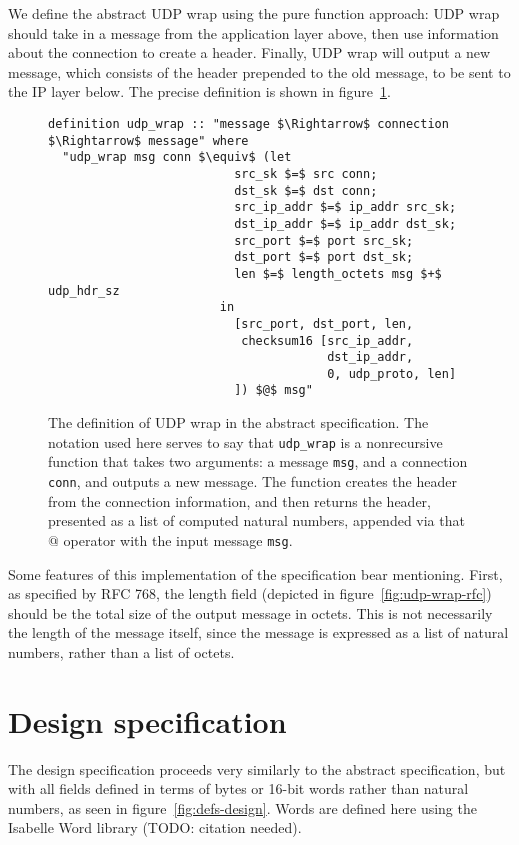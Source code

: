 \documentclass[twoside]{memoir}
\begin{document}
We define the abstract UDP wrap using the pure function approach:
UDP wrap should take in a message from the application layer above,
then use information about the connection to create a header.
Finally, UDP wrap will output a new message, which consists of the header
prepended to the old message, to be sent to the IP layer below.
The precise definition is shown in figure~\ref{fig:wrap-abstract}.

\begin{figure}[htpb]
    \centering
\begin{lstlisting}[language=isabelle]
definition udp_wrap :: "message $\Rightarrow$ connection $\Rightarrow$ message" where
  "udp_wrap msg conn $\equiv$ (let
                          src_sk $=$ src conn;
                          dst_sk $=$ dst conn;
                          src_ip_addr $=$ ip_addr src_sk;
                          dst_ip_addr $=$ ip_addr dst_sk;
                          src_port $=$ port src_sk;
                          dst_port $=$ port dst_sk;
                          len $=$ length_octets msg $+$ udp_hdr_sz
                        in
                          [src_port, dst_port, len,
                           checksum16 [src_ip_addr,
                                       dst_ip_addr,
                                       0, udp_proto, len]
                          ]) $@$ msg"
\end{lstlisting}
    \caption{The definition of UDP wrap in the abstract specification.
        The notation used here serves to say that \lstinline{udp_wrap}
        is a nonrecursive function that takes two arguments:
        a message \lstinline{msg}, and a connection \lstinline{conn},
        and outputs a new message.
        The function creates the header from the connection information,
        and then returns
        the header, presented as a list of computed natural numbers,
        appended via that $@$ operator with the input message
        \lstinline{msg}.
    }
    \label{fig:wrap-abstract}
\end{figure}

Some features of this implementation of the specification bear mentioning.
First, as specified by RFC 768, the length field (depicted in figure~\ref{fig:udp-wrap-rfc}) should be the total size of the output message in octets.
This is not necessarily the length of the message itself,
since the message is expressed as a list of natural numbers, rather than
a list of octets.



\section{Design specification}
The design specification proceeds very similarly to the abstract specification,
but with all fields defined in terms of bytes or 16-bit words rather than
natural numbers, as seen in figure~\ref{fig:defs-design}.
Words are defined here using the Isabelle Word library
(TODO: citation needed).
\end{document}
